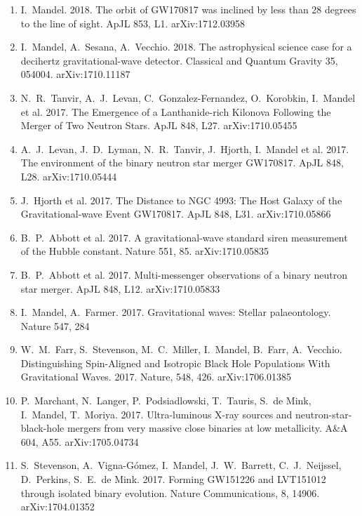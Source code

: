 \documentclass[margin,line]{res}
\begin{document}
\begin{resume}
\begin{enumerate}
\item I.~Mandel.  2018. The orbit of GW170817 was inclined by less than 28 degrees to the line of sight.  ApJL 853, L1. arXiv:1712.03958

\item I.~Mandel, A.~Sesana, A.~Vecchio. 2018.  The astrophysical science case for a decihertz gravitational-wave detector.  Classical and Quantum Gravity 35, 054004. arXiv:1710.11187

\item N.~R.~Tanvir, A.~J.~Levan, C.~Gonzalez-Fernandez, O.~Korobkin, I.~Mandel et al. 2017.  The Emergence of a Lanthanide-rich Kilonova Following the Merger of Two Neutron Stars.  ApJL 848, L27.  arXiv:1710.05455 

\item A.~J.~Levan, J.~D.~Lyman, N.~R.~Tanvir, J.~Hjorth, I.~Mandel et al. 2017. The environment of the binary neutron star merger GW170817.  ApJL 848, L28.  arXiv:1710.05444

\item J.~Hjorth et al. 2017. The Distance to NGC 4993: The Host Galaxy of the Gravitational-wave Event GW170817.  ApJL 848, L31.  arXiv:1710.05866

\item B.~P.~Abbott et al. 2017.   A gravitational-wave standard siren measurement of the Hubble constant.  Nature 551, 85. arXiv:1710.05835

\item B.~P.~Abbott et al. 2017. Multi-messenger observations of a binary neutron star merger. ApJL 848, L12. arXiv:1710.05833

\item I.~Mandel, A.~Farmer.  2017. Gravitational waves: Stellar palaeontology.  Nature 547, 284

\item W.~M.~Farr, S.~Stevenson, M.~C.~Miller, I.~Mandel, B.~Farr, A.~Vecchio.  Distinguishing Spin-Aligned and Isotropic Black Hole Populations With Gravitational Waves. 2017. Nature, 548, 426. arXiv:1706.01385

\item P.~Marchant, N.~Langer, P.~Podsiadlowski, T.~Tauris, S.~de Mink, I.~Mandel, T.~Moriya.  2017.  Ultra-luminous X-ray sources and neutron-star-black-hole mergers from very massive close binaries at low metallicity.  A\&A 604, A55.  arXiv:1705.04734

\item S.~Stevenson, A.~Vigna-G\'omez, I.~Mandel, J.~W.~Barrett, C.~J.~Neijssel, D.~Perkins, S.~E.~de Mink.  2017.  Forming GW151226 and LVT151012 through isolated binary evolution.  Nature Communications, 8,  14906.  arXiv:1704.01352


\end{enumerate}
\end{resume}
\end{document}

